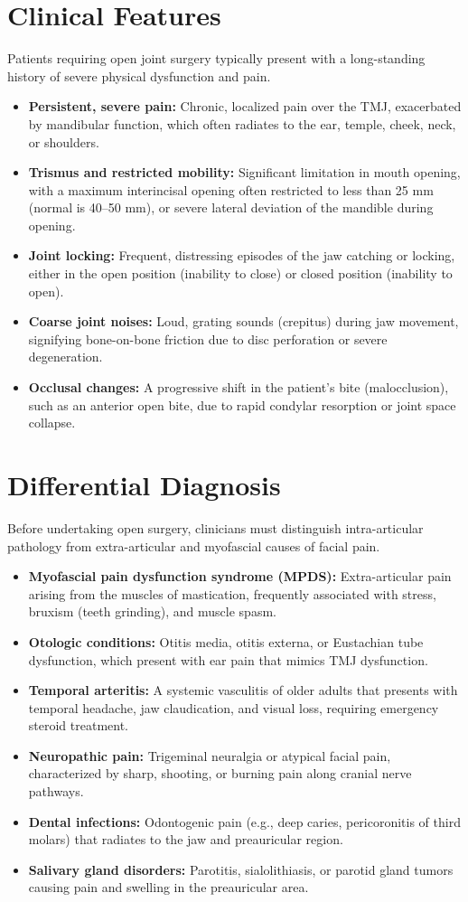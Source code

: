 \section*{Clinical Features}
Patients requiring open joint surgery typically present with a long-standing history of severe physical dysfunction and pain.
\begin{itemize}
    \item \textbf{Persistent, severe pain:} Chronic, localized pain over the TMJ, exacerbated by mandibular function, which often radiates to the ear, temple, cheek, neck, or shoulders.
    \item \textbf{Trismus and restricted mobility:} Significant limitation in mouth opening, with a maximum interincisal opening often restricted to less than 25 mm (normal is 40--50 mm), or severe lateral deviation of the mandible during opening.
    \item \textbf{Joint locking:} Frequent, distressing episodes of the jaw catching or locking, either in the open position (inability to close) or closed position (inability to open).
    \item \textbf{Coarse joint noises:} Loud, grating sounds (crepitus) during jaw movement, signifying bone-on-bone friction due to disc perforation or severe degeneration.
    \item \textbf{Occlusal changes:} A progressive shift in the patient's bite (malocclusion), such as an anterior open bite, due to rapid condylar resorption or joint space collapse.
\end{itemize}

\section*{Differential Diagnosis}
Before undertaking open surgery, clinicians must distinguish intra-articular pathology from extra-articular and myofascial causes of facial pain.
\begin{itemize}
    \item \textbf{Myofascial pain dysfunction syndrome (MPDS):} Extra-articular pain arising from the muscles of mastication, frequently associated with stress, bruxism (teeth grinding), and muscle spasm.
    \item \textbf{Otologic conditions:} Otitis media, otitis externa, or Eustachian tube dysfunction, which present with ear pain that mimics TMJ dysfunction.
    \item \textbf{Temporal arteritis:} A systemic vasculitis of older adults that presents with temporal headache, jaw claudication, and visual loss, requiring emergency steroid treatment.
    \item \textbf{Neuropathic pain:} Trigeminal neuralgia or atypical facial pain, characterized by sharp, shooting, or burning pain along cranial nerve pathways.
    \item \textbf{Dental infections:} Odontogenic pain (e.g., deep caries, pericoronitis of third molars) that radiates to the jaw and preauricular region.
    \item \textbf{Salivary gland disorders:} Parotitis, sialolithiasis, or parotid gland tumors causing pain and swelling in the preauricular area.
\end{itemize}

